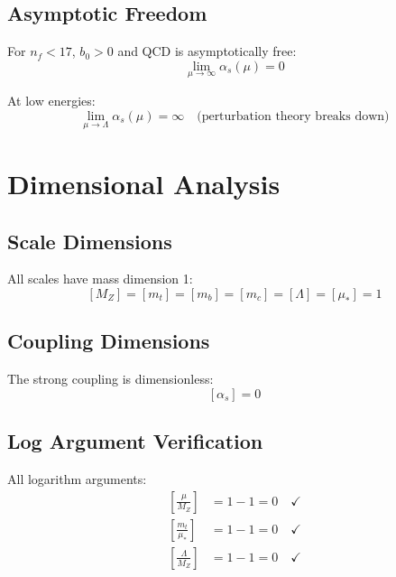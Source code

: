 \documentclass[11pt,a4paper]{article}
\theoremstyle{definition}
\begin{document}
\subsection{Asymptotic Freedom}
\label{subsec:asymptotic}

For $n_f < 17$, $b_0 > 0$ and QCD is asymptotically free:
\begin{equation}
\label{eq:asymptotic}
\lim_{\mu \to \infty} \alpha_s(\mu) = 0
\end{equation}

At low energies:
\begin{equation}
\label{eq:confinement}
\lim_{\mu \to \Lambda} \alpha_s(\mu) = \infty \quad \text{(perturbation theory breaks down)}
\end{equation}

\section{Dimensional Analysis}
\label{sec:dim-analysis}

\subsection{Scale Dimensions}
\label{subsec:scale-dim}

All scales have mass dimension 1:
\begin{equation}
\label{eq:dim-scales}
[M_Z] = [m_t] = [m_b] = [m_c] = [\Lambda] = [\mu_*] = 1
\end{equation}

\subsection{Coupling Dimensions}
\label{subsec:coupling-dim}

The strong coupling is dimensionless:
\begin{equation}
\label{eq:dim-alpha}
[\alpha_s] = 0
\end{equation}

\subsection{Log Argument Verification}
\label{subsec:log-verify}

All logarithm arguments:
\begin{align}
\label{eq:log-arg-1}
\left[\frac{\mu}{M_Z}\right] &= 1 - 1 = 0 \quad \checkmark \\
\label{eq:log-arg-2}
\left[\frac{m_t}{\mu_*}\right] &= 1 - 1 = 0 \quad \checkmark \\
\label{eq:log-arg-3}
\left[\frac{\Lambda}{M_Z}\right] &= 1 - 1 = 0 \quad \checkmark
\end{align}
\end{document}
